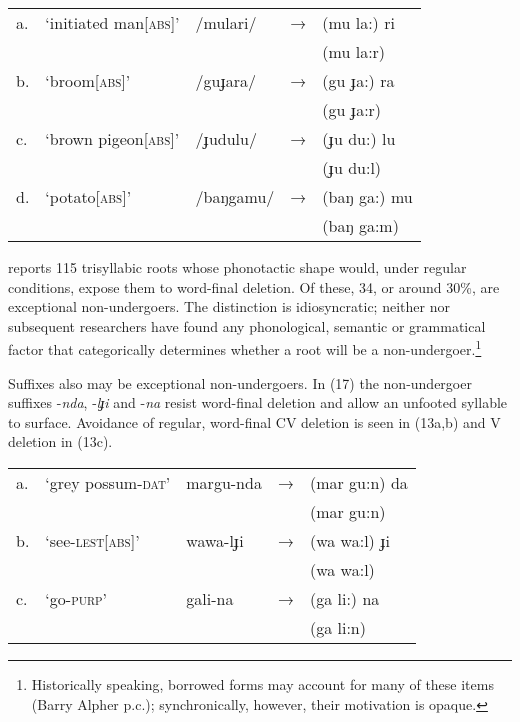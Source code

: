 \documentclass[output=paper,
modfonts
]{LSP/langsci}
\begin{document}
\ea\begin{tabular}[t]{@{}lllll}
a. & ‘initiated man[\textsc{abs}]’ & /mulari/ & → & (mu la:) ri \\
&&&& \ljudge{*}(mu la:r) \\
b. & ‘broom[\textsc{abs}]’ & /guɟara/ & → & (gu ɟa:) ra \\
&&&& \ljudge{*}(gu ɟa:r) \\
c. & ‘brown pigeon[\textsc{abs}]’ &  /ɟudulu/ & → & (ɟu du:) lu \\
&&&& \ljudge{*}(ɟu du:l)\\
d. & ‘potato[\textsc{abs}]’ & /baŋgamu/ & → & (baŋ ga:) mu \\
&&&& \ljudge{*}(baŋ ga:m)\\
\end{tabular}
\z

\noindent \citet[59]{dixon1977a} reports 115 trisyllabic roots whose phonotactic shape would, under regular conditions, expose them to word-final deletion. Of these, 34, or around 30\%, are exceptional non-undergoers. The distinction is idiosyncratic; neither \citet[58]{dixon1977a} nor subsequent researchers have found any phonological, semantic or grammatical factor that categorically determines whether a root will be a non-undergoer.\footnote{Historically speaking, borrowed forms may account for many of these items (Barry Alpher p.c.); synchronically, however, their motivation is opaque.}

Suffixes also may be exceptional non-undergoers. In (17) the non-undergoer suffixes -\textit{nda}, -\textit{lɟi} and -\textit{na} resist word-final deletion and allow an unfooted syllable to surface. Avoidance of regular, word-final CV deletion is seen in (13a,b) and V deletion in (13c).

\ea\begin{tabular}[t]{@{}lllll}
a. &`grey possum\textsc{-dat}' & margu-nda  & → &  (mar gu:n) da \\
&&&& \ljudge{*}(mar gu:n) \\
b. &`see-\textsc{lest[abs]}' & wawa-lɟi & → & (wa wa:l) ɟi \\
&&&& \ljudge{*}(wa wa:l) \\
c. &`go-\textsc{purp}' & gali-na & → & (ga li:) na \\
&&&& \ljudge{*}(ga li:n) \\
\end{tabular}
\z
\end{document}
